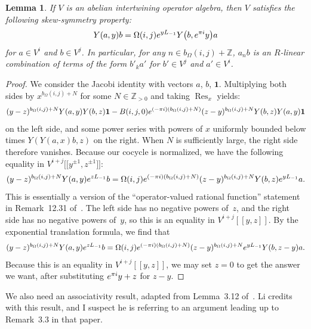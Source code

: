 \documentclass[11pt]{article}
\newcommand{\bZ}{\mathbb{Z}}
\newcommand{\unit}{\mathbf{1}}
\DeclareMathOperator{\Res}{Res}
\newtheorem{lem}[thm]{Lemma}
\theoremstyle{definition}
\begin{document}
\begin{lem} \label{lem:skew-symmetry-for-AIA}If $V$ is an abelian intertwining operator algebra, then $V$ satisfies the following skew-symmetry property:
\begin{gather*} Y(a,y)b = \Omega(i,j){\rm e}^{yL_{-1}}Y\big(b,{\rm e}^{\pi {\rm i}}y\big)a \end{gather*}
for $a \in V^i$ and $b \in V^j$. In particular, for any $n \in b_\Omega(i,j) + \bZ$, $a_n b$ is an $R$-linear combination of terms of the form $b'_k a'$ for $b' \in V^j$ and $a' \in V^i$.
\end{lem}
\begin{proof}We consider the Jacobi identity with vectors $a$, $b$, $\unit$. Multiplying both sides by $x^{b_\Omega(i,j)+N}$ for some $N \in \bZ_{>0}$ and taking $\Res_x$ yields:
\begin{gather*} (y-z)^{b_\Omega(i,j)+N}Y(a,y) Y(b,z) \unit - B(i,j,0) {\rm e}^{(-\pi {\rm i})(b_\Omega(i,j)+N)}(z-y)^{b_\Omega(i,j)+N} Y(b,z) Y(a,y) \unit \end{gather*}
on the left side, and some power series with powers of $x$ uniformly bounded below times $Y(Y(a,x)b,z)$ on the right. When $N$ is sufficiently large, the right side therefore vanishes. Because our cocycle is normalized, we have the following equality in $V^{i+j}\big[\big[y^{\pm 1},z^{\pm 1}\big]\big]$:
\begin{gather*} (y-z)^{b_\Omega(i,j)+N}Y(a,y) {\rm e}^{zL_{-1}}b = \Omega(i,j) {\rm e}^{(-\pi {\rm i})(b_\Omega(i,j)+N)}(z-y)^{b_\Omega(i,j)+N} Y(b,z) {\rm e}^{yL_{-1}}a. \end{gather*}
This is essentially a version of the ``operator-valued rational function'' statement in Remark~12.31 of~\cite{DL93}. The left side has no negative powers of~$z$, and the right side has no negative powers of~$y$, so this is an equality in $V^{i+j}[[y,z]]$. By the exponential translation formula, we find that
\begin{gather*} (y-z)^{b_\Omega(i,j)+N}Y(a,y) {\rm e}^{zL_{-1}}b = \Omega(i,j) {\rm e}^{(-\pi {\rm i})(b_\Omega(i,j)+N)}(z-y)^{b_\Omega(i,j)+N} {\rm e}^{yL_{-1}} Y(b,z-y) a. \end{gather*}
Because this is an equality in $V^{i+j}[[y,z]]$, we may set $z=0$ to get the answer we want, after substituting ${\rm e}^{\pi {\rm i}}y + z$ for $z-y$.
\end{proof}

We also need an associativity result, adapted from Lemma~3.12 of~\cite{L99}. Li credits~\cite{DLM96} with this result, and I suspect he is referring to an argument leading up to Remark~3.3 in that paper.
\end{document}
